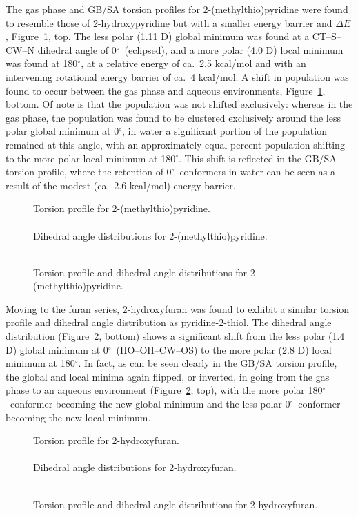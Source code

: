 \documentclass[12pt]{report}
\def\deg{$^{\circ}$}
\def\figlab{Figure}\def\figslab{\figlab s}
\newcommand*\fig[1]{\figlab~\ref{#1}}
\begin{document}
The gas phase and GB/SA torsion profiles for 2-(methylthio)pyridine were found to resemble those of 2-hydroxypyridine but with a smaller energy barrier and $\Delta E$, \fig{dihp6smegb}, top. The less polar (1.11 D) global minimum was found at a CT--S--CW--N dihedral angle of 0\deg\ (eclipsed), and a more polar (4.0 D) local minimum was found at 180\deg, at a relative energy of ca.\ 2.5 kcal/mol and with an intervening rotational energy barrier of ca.\ 4 kcal/mol. A shift in population was found to occur between the gas phase and aqueous environments, \fig{dihp6smegb}, bottom. Of note is that the population was not shifted exclusively: whereas in the gas phase, the population was found to be clustered exclusively around the less polar global minimum at 0\deg, in water a significant portion of the population remained at this angle, with an approximately equal percent population shifting to the more polar local minimum at 180\deg. This shift is reflected in the GB/SA torsion profile, where the retention of 0\deg\ conformers in water can be seen as a result of the modest (ca.\ 2.6 kcal/mol) energy barrier.

\begin{figure}[htbp]
\centering
Torsion profile for 2-(methylthio)pyridine.\\
\\
Dihedral angle distributions for 2-(methylthio)pyridine.\\
\\
\caption{Torsion profile and dihedral angle distributions for 2-(methylthio)pyridine.}
\label{dihp6smegb}
\end{figure}

Moving to the furan series, 2-hydroxyfuran was found to exhibit a similar torsion profile and dihedral angle distribution as pyridine-2-thiol. The dihedral angle distribution (\fig{dihfohgb}, bottom) shows a significant shift from the less polar (1.4 D) global minimum at 0\deg\ (HO--OH--CW--OS) to the more polar (2.8 D) local minimum at 180\deg. In fact, as can be seen clearly in the GB/SA torsion profile, the global and local minima again flipped, or inverted, in going from the gas phase to an aqueous environment (\fig{dihfohgb}, top), with the more polar 180\deg\ conformer becoming the new global minimum and the less polar 0\deg\ conformer becoming the new local minimum.

\begin{figure}[htbp]
\centering
Torsion profile for 2-hydroxyfuran.\\
\\
Dihedral angle distributions for 2-hydroxyfuran.\\
\\
\caption{Torsion profile and dihedral angle distributions for 2-hydroxyfuran.}
\label{dihfohgb}
\end{figure}
\end{document}
